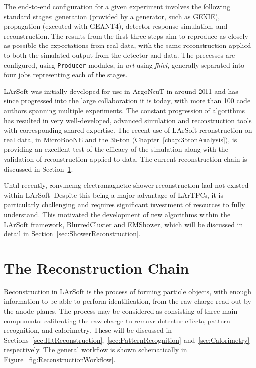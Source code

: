 The end-to-end configuration for a given experiment involves the following standard stages: generation (provided by a generator, such as GENIE), propagation (executed with GEANT4), detector response simulation, and reconstruction.  The results from the first three steps aim to reproduce as closely as possible the expectations from real data, with the same reconstruction applied to both the simulated output from the detector and data.  The processes are configured, using \texttt{Producer} modules, in \textit{art} using \textit{fhicl}, generally separated into four jobs representing each of the stages.

LArSoft was initially developed for use in ArgoNeuT in around 2011 and has since progressed into the large collaboration it is today, with more than 100 code authors spanning multiple experiments.  The constant progression of algorithms has resulted in very well-developed, advanced simulation and reconstruction tools with corresponding shared expertise.  The recent use of LArSoft reconstruction on real data, in MicroBooNE \cite{MicroBooNEReconstruction2017} and the 35-ton (Chapter~\ref{chap:35tonAnalysis}), is providing an excellent test of the efficacy of the simulation along with the validation of reconstruction applied to data.  The current reconstruction chain is discussed in Section~\ref{sec:ReconstructionChain}.

Until recently, convincing electromagnetic shower reconstruction had not existed within LArSoft.  Despite this being a major advantage of LArTPCs, it is particularly challenging and requires significant investment of resources to fully understand.  This motivated the development of new algorithms within the LArSoft framework, BlurredCluster and EMShower, which will be discussed in detail in Section~\ref{sec:ShowerReconstruction}.

\section{The Reconstruction Chain}\label{sec:ReconstructionChain}

Reconstruction in LArSoft is the process of forming particle objects, with enough information to be able to perform identification, from the raw charge read out by the anode planes.  The process may be considered as consisting of three main components: calibrating the raw charge to remove detector effects, pattern recognition, and calorimetry.  These will be discussed in Sections~\ref{sec:HitReconstruction},~\ref{sec:PatternRecognition} and~\ref{sec:Calorimetry} respectively.  The general workflow is shown schematically in Figure~\ref{fig:ReconstructionWorkflow}.

